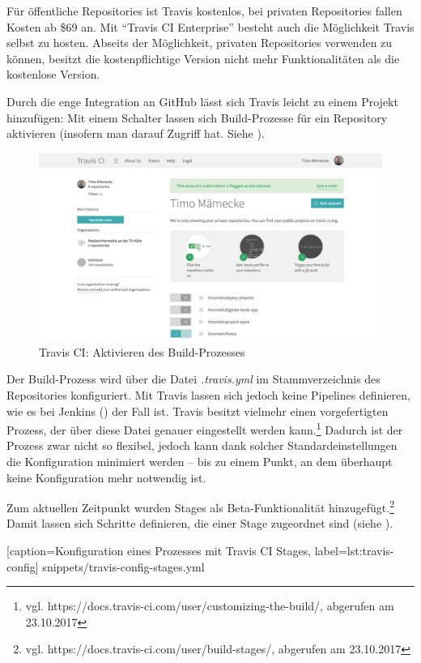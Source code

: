 Für öffentliche Repositories ist Travis kostenlos, bei privaten Repositories fallen Kosten ab \$69 an. Mit ``Travis CI Enterprise'' besteht auch die Möglichkeit Travis selbst zu hosten. Abseits der Möglichkeit, privaten Repositories verwenden zu können, besitzt die kostenpflichtige Version nicht mehr Funktionalitäten als die kostenlose Version.

Durch die enge Integration an GitHub lässt sich Travis leicht zu einem Projekt hinzufügen: Mit einem Schalter lassen sich Build-Prozesse für ein Repository aktivieren (insofern man darauf Zugriff hat. Siehe ).

\begin{figure}[h]
  \caption{Travis CI: Aktivieren des Build-Prozesses}
  \label{fig:travis-activate}
  \includegraphics[width=.8\textwidth]{assets/travis-activate}
\end{figure}

Der Build-Prozess wird über die Datei \emph{.travis.yml} im Stammverzeichnis des Repositories konfiguriert. Mit Travis lassen sich jedoch keine Pipelines definieren, wie es bei Jenkins () der Fall ist. Travis besitzt vielmehr einen vorgefertigten Prozess, der über diese Datei genauer eingestellt werden kann.\footnote{vgl. https://docs.travis-ci.com/user/customizing-the-build/, abgerufen am 23.10.2017} Dadurch ist der Prozess zwar nicht so flexibel, jedoch kann dank solcher Standardeinstellungen die Konfiguration minimiert werden – bis zu einem Punkt, an dem überhaupt keine Konfiguration mehr notwendig ist.

Zum aktuellen Zeitpunkt wurden Stages als Beta-Funktionalität hinzugefügt.\footnote{vgl. https://docs.travis-ci.com/user/build-stages/, abgerufen am 23.10.2017} Damit lassen sich Schritte definieren, die einer Stage zugeordnet sind (siehe ).


  [caption={Konfiguration eines Prozesses mit Travis CI Stages},
  label={lst:travis-config}]
  {snippets/travis-config-stages.yml}

